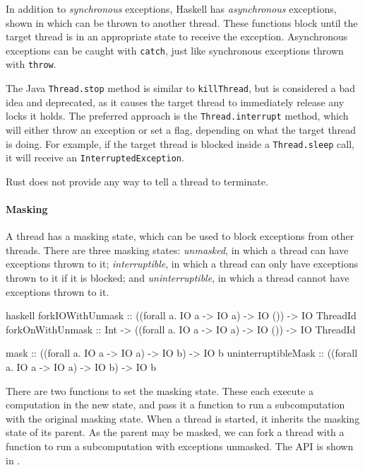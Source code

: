 In addition to \emph{synchronous} exceptions, Haskell has
\emph{asynchronous} exceptions, shown in 
which can be thrown to another thread.  These functions block until
the target thread is in an appropriate state to receive the exception.
Asynchronous exceptions can be caught with \verb|catch|, just like
synchronous exceptions thrown with \verb|throw|.

The Java \verb|Thread.stop| method is similar to \verb|killThread|,
but is considered a bad idea and deprecated, as it causes the target
thread to immediately release any locks it holds\cite{oracle2017}.
The preferred approach is the \verb|Thread.interrupt| method, which
will either throw an exception or set a flag, depending on what the
target thread is doing.  For example, if the target thread is blocked
inside a \verb|Thread.sleep| call, it will receive an
\verb|InterruptedException|.

Rust does not provide any way to tell a thread to terminate.

\paragraph{Masking}
A thread has a masking state, which can be used to block exceptions
from other threads.  There are three masking states: \emph{unmasked},
in which a thread can have exceptions thrown to it;
\emph{interruptible}, in which a thread can only have exceptions
thrown to it if it is blocked; and \emph{uninterruptible}, in which a
thread cannot have exceptions thrown to it.

\begin{listing}
\centering
\begin{cminted}{haskell}
forkIOWithUnmask    :: ((forall a. IO a -> IO a) -> IO ()) -> IO ThreadId
forkOnWithUnmask    :: Int -> ((forall a. IO a -> IO a) -> IO ()) -> IO ThreadId

mask                :: ((forall a. IO a -> IO a) -> IO b) -> IO b
uninterruptibleMask :: ((forall a. IO a -> IO a) -> IO b) -> IO b
\end{cminted}
\caption{Masking exceptions in Haskell.}\label{lst:excm_haskell}
\end{listing}

There are two functions to set the masking state.  These each execute
a computation in the new state, and pass it a function to run a
subcomputation with the original masking state.  When a thread is
started, it inherits the masking state of its parent.  As the parent
may be masked, we can fork a thread with a function to run a
subcomputation with exceptions unmasked.  The API is shown in
.

